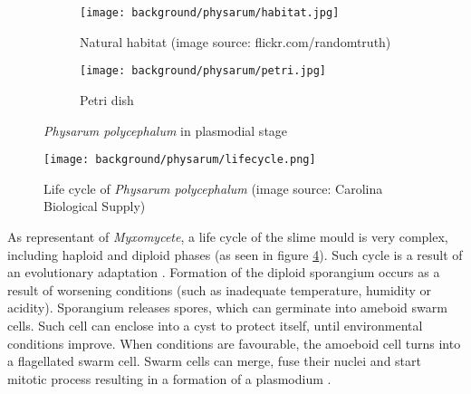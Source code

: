 \begin{figure}
  \centering
  \begin{subfigure}{0.45\textwidth}
    \centering
    \texttt{[image: background/physarum/habitat.jpg]}
    \caption{Natural habitat (image source: flickr.com/randomtruth)}
    \label{figure:bp_habitat}
  \end{subfigure}
  \begin{subfigure}{0.45\textwidth}
    \centering
    \texttt{[image: background/physarum/petri.jpg]}
    \caption{Petri dish}
    \label{figure:bp_petri}
  \end{subfigure}
  \caption{\textit{Physarum polycephalum} in plasmodial stage}
\end{figure}

\begin{figure}
  \centering
  \texttt{[image: background/physarum/lifecycle.png]}
  \caption{Life cycle of \textit{Physarum polycephalum} (image source: Carolina Biological Supply)}
  \label{figure:bp_lifecycle}
\end{figure}

As representant of \textit{Myxomycete}, a life cycle of the slime mould is very complex, including haploid and diploid phases (as seen in figure \ref{figure:bp_lifecycle}). Such cycle is a result of an evolutionary adaptation \cite{stephenson1994myxomycetes}. Formation of the diploid sporangium occurs as a result of worsening conditions (such as inadequate temperature, humidity or acidity). Sporangium releases spores, which can germinate into ameboid swarm cells. Such cell can enclose into a cyst to protect itself, until environmental conditions improve. When conditions are favourable, the amoeboid cell turns into a flagellated swarm cell. Swarm cells can merge, fuse their nuclei and start mitotic process resulting in a formation of a plasmodium \cite{jones2015pattern}.

